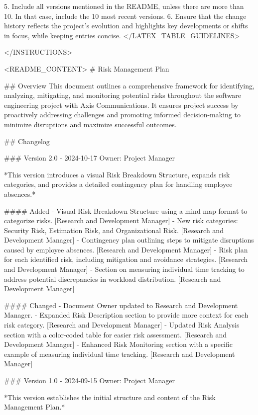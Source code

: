 5. Include all versions mentioned in the README, unless there are more than 10. In that case, include the 10 most recent versions.
6. Ensure that the change history reflects the project's evolution and highlights key developments or shifts in focus, while keeping entries concise.
</LATEX_TABLE_GUIDELINES>

</INSTRUCTIONS>

<README_CONTENT>
# Risk Management Plan

## Overview
This document outlines a comprehensive framework for identifying, analyzing, mitigating, and monitoring potential risks throughout the software engineering project with Axis Communications. It ensures project success by proactively addressing challenges and promoting informed decision-making to minimize disruptions and maximize successful outcomes.

## Changelog

### Version 2.0 - 2024-10-17
Owner: Project Manager

*This version introduces a visual Risk Breakdown Structure, expands risk categories, and provides a detailed contingency plan for handling employee absences.*

#### Added
- Visual Risk Breakdown Structure using a mind map format to categorize risks. [Research and Development Manager]
- New risk categories: Security Risk, Estimation Risk, and Organizational Risk. [Research and Development Manager]
- Contingency plan outlining steps to mitigate disruptions caused by employee absences. [Research and Development Manager]
- Risk plan for each identified risk, including mitigation and avoidance strategies. [Research and Development Manager]
- Section on measuring individual time tracking to address potential discrepancies in workload distribution. [Research and Development Manager]

#### Changed
- Document Owner updated to Research and Development Manager. 
- Expanded Risk Description section to provide more context for each risk category. [Research and Development Manager]
- Updated Risk Analysis section with a color-coded table for easier risk assessment. [Research and Development Manager]
- Enhanced Risk Monitoring section with a specific example of measuring individual time tracking. [Research and Development Manager]

### Version 1.0 - 2024-09-15  
Owner: Project Manager

*This version establishes the initial structure and content of the Risk Management Plan.*

